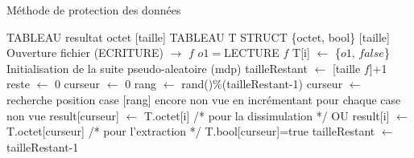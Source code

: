 \documentclass[11pt]{article}
\begin{document}
\begin{minipage}{.3\textwidth}
 
\end{minipage}
\begin{minipage}{.4\textwidth}
\begin{algorithm}[H]
\caption{Méthode de protection des données}
\begin{algorithmic}
\footnotesize
\STATE TABLEAU resultat {octet} [taille]
\STATE TABLEAU T STRUCT \{octet, bool\} [taille]
\STATE Ouverture fichier (ECRITURE) $\rightarrow$ $f$
\STATE $o1 = $LECTURE $f$
\STATE T[i] $\leftarrow$ \{$o1$, $false$\}
\ENDFOR
\STATE Initialisation de la suite pseudo-aleatoire (mdp)
\STATE tailleRestant $\leftarrow$ [taille $f$]+1
\STATE reste $\leftarrow$ 0
\STATE curseur $\leftarrow$ 0
\STATE rang $\leftarrow$ rand()\%(tailleRestant-1)
\STATE curseur $\leftarrow$ recherche position case [rang] encore non vue 
en incrémentant pour chaque case non vue
\color{red}
\STATE result[curseur] $\leftarrow$ T.octet[i] /* pour la dissimulation */
\color{black} OU \color{blue} result[i] $\leftarrow$ T.octet[curseur] /* pour l'extraction */
\color{black}
\STATE T.bool[curseur]=true
\STATE tailleRestant $\leftarrow$ tailleRestant-1
\ENDFOR
\normalsize
\end{algorithmic}
\end{algorithm}
\end{minipage}
\end{document}
